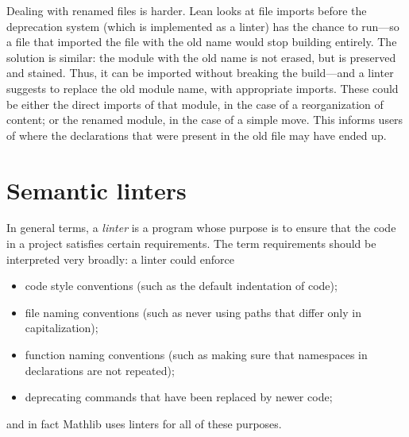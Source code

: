 \documentclass[runningheads]{llncs}
\def\mathlib{Mathlib\xspace}
\begin{document}
Dealing with renamed files is harder.
Lean looks at file imports before the deprecation system (which is implemented as a linter) has the chance to run---so a file that imported the file with the old name would stop building entirely.
The solution is similar: the module with the old name is not erased, but is preserved and stained.
Thus, it can be imported without breaking the build---and a linter suggests to replace the old module name, with appropriate imports.
These could be either the direct imports of that module, in the case of a reorganization of content; or the renamed module, in the case of a simple move.
This informs users of where the declarations that were present in the old file may have ended up.

\section{Semantic linters}
\label{sec:linters}

In general terms, a {\emph{linter}} is a program whose purpose is to ensure that the code in a project satisfies certain requirements.
The term requirements should be interpreted very broadly: a linter could enforce
\begin{itemize}
	\item code style conventions (such as the default indentation of code);
	\item file naming conventions (such as never using paths that differ only in capitalization);
	\item function naming conventions (such as making sure that namespaces in declarations are not repeated);
	\item deprecating commands that have been replaced by newer code;
\end{itemize}
and in fact \mathlib uses linters for all of these purposes.
\end{document}
